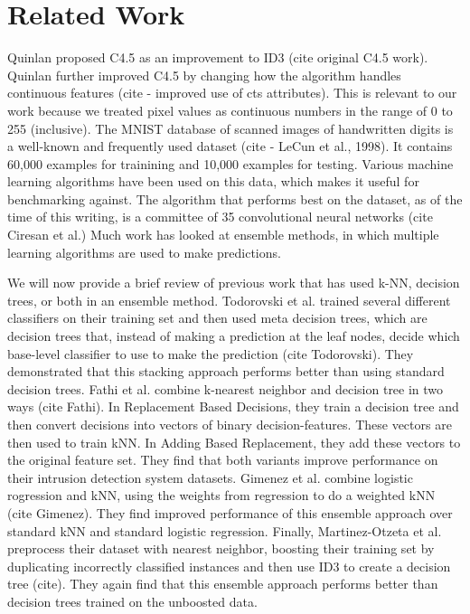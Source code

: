 \section{Related Work}
Quinlan proposed C4.5 as an improvement to ID3 (cite original C4.5 work). Quinlan further improved C4.5 by changing how the algorithm handles continuous features (cite - improved use of cts attributes). This is relevant to our work because we treated pixel values as continuous numbers in the range of 0 to 255 (inclusive). 
The MNIST database of scanned images of handwritten digits is a well-known and frequently used dataset (cite - LeCun et al., 1998). It contains 60,000 examples for trainining and 10,000 examples for testing. Various machine learning algorithms have been used on this data, which makes it useful for benchmarking against. The algorithm that performs best on the dataset, as of the time of this writing, is a committee of 35 convolutional neural networks (cite Ciresan et al.)
Much work has looked at ensemble methods, in which multiple learning algorithms are used to make predictions. 

We will now provide a brief review of previous work that has used k-NN, decision trees, or both in an ensemble method. Todorovski et al. trained several different classifiers on their training set and then used meta decision trees, which are decision trees that, instead of making a prediction at the leaf nodes, decide which base-level classifier to use to make the prediction (cite Todorovski). They demonstrated that this stacking approach performs better than using standard decision trees.
Fathi et al. combine k-nearest neighbor and decision tree in two ways (cite Fathi). In Replacement Based Decisions, they train a decision tree and then convert decisions into vectors of binary decision-features. These vectors are then used to train kNN. In Adding Based Replacement, they add these vectors to the original feature set. They find that both variants improve performance on their intrusion detection system datasets.
Gimenez et al. combine logistic rogression and kNN, using the weights from regression to do a weighted kNN (cite Gimenez). They find improved performance of this ensemble approach over standard kNN and standard logistic regression. Finally, Martinez-Otzeta et al. preprocess their dataset with nearest neighbor, boosting their training set by duplicating incorrectly classified instances and then use ID3 to create a decision tree (cite). They again find that this ensemble approach performs better than decision trees trained on the unboosted data. 


